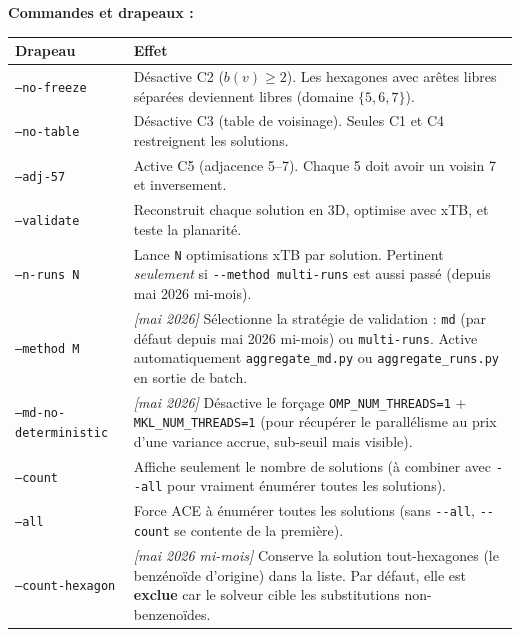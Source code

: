 \textbf{Commandes et drapeaux :}

\begin{center}
\begin{tabular}{lp{9cm}}
  \toprule
  Drapeau & Effet \\
  \midrule
  \texttt{--no-freeze} & Désactive C2 ($b(v) \geq 2$). Les hexagones avec arêtes libres
    séparées deviennent libres (domaine $\{5, 6, 7\}$). \\
  \texttt{--no-table} & Désactive C3 (table de voisinage). Seules C1 et C4 restreignent
    les solutions. \\
  \texttt{--adj-57} & Active C5 (adjacence 5--7). Chaque 5 doit avoir un voisin 7 et
    inversement. \\
  \texttt{--validate} & Reconstruit chaque solution en 3D, optimise avec xTB, et teste
    la planarité. \\
  \texttt{--n-runs N} & Lance \texttt{N} optimisations xTB par solution. Pertinent
    \emph{seulement} si \texttt{-{}-method multi-runs} est aussi passé (depuis mai 2026
    mi-mois). \\
  \texttt{--method M} & \emph{[mai 2026]} Sélectionne la stratégie de validation :
    \texttt{md} (par défaut depuis mai 2026 mi-mois) ou \texttt{multi-runs}.
    Active automatiquement \texttt{aggregate\_md.py} ou \texttt{aggregate\_runs.py}
    en sortie de batch. \\
  \texttt{--md-no-deterministic} & \emph{[mai 2026]} Désactive le forçage
    \texttt{OMP\_NUM\_THREADS=1} + \texttt{MKL\_NUM\_THREADS=1} (pour récupérer
    le parallélisme au prix d'une variance accrue, sub-seuil mais visible). \\
  \texttt{--count} & Affiche seulement le nombre de solutions (à combiner avec
    \texttt{-{}-all} pour vraiment énumérer toutes les solutions). \\
  \texttt{--all} & Force ACE à énumérer toutes les solutions (sans \texttt{-{}-all},
    \texttt{-{}-count} se contente de la première). \\
  \texttt{--count-hexagon} & \emph{[mai 2026 mi-mois]} Conserve la solution
    tout-hexagones (le benzénoïde d'origine) dans la liste. Par défaut, elle est
    \textbf{exclue} car le solveur cible les substitutions non-benzenoïdes. \\
  \bottomrule
\end{tabular}
\end{center}

